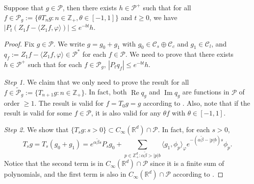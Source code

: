 \documentclass[EJP]{ejpecp} %
\begin{document}
\begin{lemma}
  \label{lem:P:R}
  Suppose that $g \in \mathcal P$, then there exists $h \in \mathcal P^+$ such that for all $ f \in \mathcal P_g := \{\theta T_n g: n \in \mathbb Z_+, \theta \in [-1,1]\} $ and $t\geq 0$, we have $ | P_t (Z_1 f - \langle Z_1 f, \varphi \rangle )| \leq e^{-bt} h$.
\end{lemma}
\begin{proof}
Fix $g \in \mathcal P$.
We write  $g = g_0 + g_1$ with $g_0 \in \mathcal C_s \oplus \mathcal C_c$ and $g_1 \in \mathcal C_l$,  and $q_f:=Z_1f - \langle Z_1f, \varphi \rangle\in \mathcal P^*$ for each $f\in \mathcal P$.
  We need to prove that there exists $h \in \mathcal P^+$ such that for each $f\in \mathcal P_g$, $|P_tq_f| \leq e^{-bt} h$.

  \emph{Step 1.} We claim  that we only need to prove the result for all
  $f \in \widetilde{\mathcal P}_g:= \{T_{n+1} g : n \in \mathbb Z_+\}$.
  In fact, both $\operatorname{Re} q_g$ and $\operatorname{Im} q_g$ are functions in $\mathcal P$ of order $\geq 1$.
  The result is valid for $f = T_0 g = g$ according to \cite[Fact 1.2]{MarksMilos2018CLT}.
  Also, note that if the result is valid for some $f \in \mathcal P$, it is also valid for any $\theta f$ with $\theta \in [-1,1]$.


  \emph{Step 2.} We show that $\{T_s g: s> 0\} \subset C_\infty (\mathbb R^d) \cap \mathcal P$.
  In fact, for each $s > 0$,
  \[
    T_s g
    = T_s (g_0 + g_1)
    = e^{\alpha \tilde \beta s}P_s g_0 + \sum_{p \in \mathbb Z_+^d: \alpha \tilde \beta > |p|b} 
    \langle g_1, \phi_p \rangle_\varphi e^{-(\alpha \tilde \beta - |p|b)s} \phi_p.
  \]
  Notice that the second term is in $C_\infty(\mathbb R^d)\cap \mathcal P$ since it is a finite sum of polynomials, and the first term is also in $C_\infty (\mathbb R^d) \cap \mathcal P$ according to \cite[Fact 1.1]{MarksMilos2018CLT}.


\end{proof}
\end{document}
